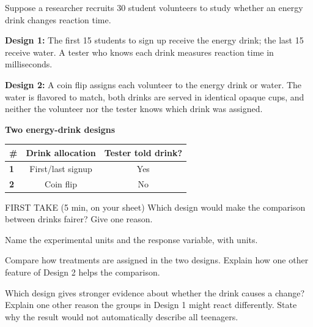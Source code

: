 \documentclass[14pt]{extarticle}
\begin{document}
\pagestyle{empty}


\noindent\begin{minipage}[t]{0.57\linewidth}
\vspace{0pt}
Suppose a researcher recruits 30 student volunteers to study whether an energy drink changes reaction time.\par\smallskip \textbf{Design 1:} The first 15 students to sign up receive the energy drink; the last 15 receive water. A tester who knows each drink measures reaction time in milliseconds.\par \textbf{Design 2:} A coin flip assigns each volunteer to the energy drink or water. The water is flavored to match, both drinks are served in identical opaque cups, and neither the volunteer nor the tester knows which drink was assigned.\par
\end{minipage}\hfill
\begin{minipage}[t]{0.40\linewidth}
\vspace{0pt}
\begin{center}
\textbf{Two energy-drink designs}\par\smallskip
\begin{tabular}{|l|c|c|}
\hline
\textbf{\#} & \textbf{Drink allocation} & \textbf{Tester told drink?} \\ \hline
\textbf{1} & First/last signup & Yes \\ \hline
\textbf{2} & Coin flip & No \\ \hline
\end{tabular}
\end{center}
\end{minipage}

\begin{firsttakebox}{FIRST TAKE (5 min, on your sheet)}
Which design would make the comparison between drinks fairer? Give one reason.
\end{firsttakebox}

\begin{description}[leftmargin=1.15in, labelwidth=1in, itemsep=2pt, topsep=2pt]
  \item[\dokbadge{1}~(a)] Name the experimental units and the response variable, with units.
  \item[\dokbadge{2}~(b)] Compare how treatments are assigned in the two designs. Explain how one other feature of Design 2 helps the comparison.
  \item[\dokbadge{3}~(c)] Which design gives stronger evidence about whether the drink causes a change? Explain one other reason the groups in Design 1 might react differently. State why the result would not automatically describe all teenagers.
\end{description}
\end{document}
